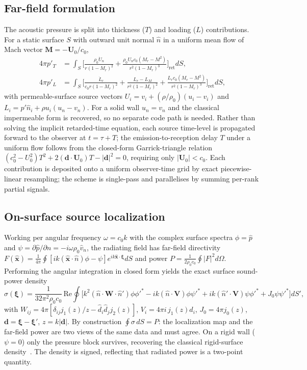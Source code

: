 \documentclass[preprint,12pt,a4paper]{elsarticle}
\begin{document}
\subsection{Far-field formulation}

The acoustic pressure is split into thickness ($T$) and loading ($L$)
contributions. For a static surface $S$ with outward unit normal $\hat{n}$
in a uniform mean flow of Mach vector $\mathbf{M}=-\mathbf{U}_0/c_0$,
\begin{align}
4\pi p'_T &= \int_S \Big[
  \tfrac{\rho_0\dot{U}_n}{r(1-M_r)^2}
  + \tfrac{\rho_0 U_n c_0(M_r-M^2)}{r^2(1-M_r)^3}\Big]_\mathrm{ret} dS,\\
4\pi p'_L &= \int_S \Big[
  \tfrac{\dot{L}_r}{c_0 r(1-M_r)^2}
  + \tfrac{L_r-L_M}{r^2(1-M_r)^2}
  + \tfrac{L_r c_0(M_r-M^2)}{r^2(1-M_r)^3}\Big]_\mathrm{ret} dS,
\end{align}
with permeable-surface source vectors $U_i=v_i+(\rho/\rho_0)(u_i-v_i)$ and
$L_i=p'\hat{n}_i+\rho u_i(u_n-v_n)$. For a solid wall $u_n=v_n$ and the
classical impermeable form is recovered, so no separate code path is
needed. Rather than solving the implicit retarded-time equation, each source
time-level is propagated forward to the observer at $t=\tau+T$; the
emission-to-reception delay $T$ under a uniform flow follows from the
closed-form Garrick-triangle relation $(c_0^2-U_0^2)T^2+2(\mathbf{d}\cdot
\mathbf{U}_0)T-|\mathbf{d}|^2=0$, requiring only $|\mathbf{U}_0|<c_0$. Each
contribution is deposited onto a uniform observer-time grid by exact
piecewise-linear resampling; the scheme is single-pass and parallelises by
summing per-rank partial signals.

\subsection{On-surface source localization}

Working per angular frequency $\omega=c_0k$ with the complex surface spectra
$\phi=\hat{p}$ and $\psi=\partial\hat{p}/\partial n=-i\omega\rho_0\hat{v}_n$,
the radiating field has far-field directivity $F(\hat{\mathbf{x}})=\frac{1}{4\pi}
\oint[ik(\hat{\mathbf{x}}\cdot\hat{n})\phi-\psi]e^{ik\hat{\mathbf{x}}\cdot
\boldsymbol{\xi}}dS$ and power $P=\frac{1}{2\rho_0 c_0}\oint|F|^2 d\Omega$.
Performing the angular integration in closed form yields the exact surface
sound-power density
\begin{equation}
\sigma(\boldsymbol{\xi}) = \frac{1}{32\pi^2\rho_0 c_0}\,\mathrm{Re}\!\oint
\big[ k^2 (\hat{n}\!\cdot\!\mathbf{W}\!\cdot\!\hat{n}')\phi\phi'^{*}
- ik(\hat{n}\!\cdot\!\mathbf{V})\phi\psi'^{*}
+ ik(\hat{n}'\!\cdot\!\mathbf{V})\psi\phi'^{*}
+ J_0\psi\psi'^{*} \big]dS',
\label{eq:sigma}
\end{equation}
with $W_{ij}=4\pi[\delta_{ij}j_1(z)/z-\hat{d}_i\hat{d}_j j_2(z)]$,
$V_i=4\pi i\,j_1(z)\hat{d}_i$, $J_0=4\pi j_0(z)$, $\mathbf{d}=\boldsymbol{\xi}
-\boldsymbol{\xi}'$, $z=k|\mathbf{d}|$. By construction $\oint\sigma\,dS=P$:
the localization map and the far-field power are two views of the same data
and must agree. On a rigid wall ($\psi=0$) only the pressure block survives,
recovering the classical rigid-surface density~\cite{delfs2024}. The density
is signed, reflecting that radiated power is a two-point quantity.
\end{document}
